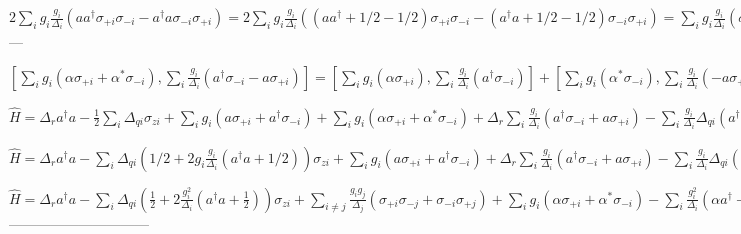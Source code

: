 \documentclass[11pt, spanish]{report}
\begin{document}
$ 2 \sum\limits_i g_i \frac{g_i} {\Delta_i} (a a^\dagger \sigma_{+i} \sigma_{-i} - a^\dagger a \sigma_{-i} \sigma_{+i}) =
2 \sum\limits_i g_i \frac{g_i} {\Delta_i} ((a a^\dagger + 1/2 - 1/2) \sigma_{+i} \sigma_{-i} - (a^\dagger a + 1/2 - 1/2) \sigma_{-i} \sigma_{+i}) =
\sum\limits_i g_i \frac{g_i} {\Delta_i} (\sigma_{+i} \sigma_{-i} + \sigma_{-i} \sigma_{+i}) -
2 \sum\limits_i g_i \frac{g_i} {\Delta_i} (a^\dagger a + 1/2) \sigma_{zi} =
\sum\limits_i (g_i \frac{g_i} {\Delta_i} - 2 g_i \frac{g_i} {\Delta_i} (a^\dagger a + 1/2) \sigma_{zi}) $
---


$ [\sum\limits_i g_i (\alpha \sigma_{+i} + \alpha^* \sigma_{-i}), \sum\limits_i \frac{g_i} {\Delta_i} (a^\dagger \sigma_{-i} - a \sigma_{+i})] =
[\sum\limits_i g_i (\alpha \sigma_{+i}), \sum\limits_i \frac{g_i} {\Delta_i} (a^\dagger \sigma_{-i})] +
[\sum\limits_i g_i (\alpha^* \sigma_{-i}), \sum\limits_i \frac{g_i} {\Delta_i} (- a \sigma_{+i})] =
- \sum\limits_i g_i \frac{g_i} {\Delta_i} (\alpha a^\dagger + \alpha^* a) \sigma_{zi} $


$\hat{H} = \Delta_r a^\dagger a - \frac{1}{2} \sum\limits_i \Delta_{qi}
\sigma_{zi} + \sum\limits_i g_i (a \sigma_{+i} + a^\dagger \sigma_{-i}) +
\sum\limits_i g_i (\alpha \sigma_{+i} + \alpha^* \sigma_{-i}) +
\Delta_r \sum\limits_i \frac{g_i} {\Delta_i} (a^\dagger \sigma_{-i} + a \sigma_{+i}) -
\sum\limits_i \frac{g_i} {\Delta_i} \Delta_{qi} (a^\dagger \sigma_{-i} + a \sigma_{+i}) +
\sum\limits_{i \neq j} g_i \frac{g_j} {\Delta_j} \sigma_{+i} \sigma_{-j} + \sigma_{-i} \sigma_{+j} +
\sum\limits_i (g_i \frac{g_i} {\Delta_i} - 2 g_i \frac{g_i} {\Delta_i} (a^\dagger a + 1/2) \sigma_{zi}) -
\sum\limits_i g_i \frac{g_i} {\Delta_i} (\alpha a^\dagger + \alpha^* a) \sigma_{zi} 
$

$\hat{H} = \Delta_r a^\dagger a - \sum\limits_i \Delta_{qi} (1/2 + 2 g_i \frac{g_i} {\Delta_i} (a^\dagger a + 1/2))
\sigma_{zi} + \sum\limits_i g_i (a \sigma_{+i} + a^\dagger \sigma_{-i}) +
\Delta_r \sum\limits_i \frac{g_i} {\Delta_i} (a^\dagger \sigma_{-i} + a \sigma_{+i}) -
\sum\limits_i \frac{g_i} {\Delta_i} \Delta_{qi} (a^\dagger \sigma_{-i} + a \sigma_{+i}) +
\sum\limits_{i \neq j} g_i \frac{g_j} {\Delta_j} \sigma_{+i} \sigma_{-j} + \sigma_{-i} \sigma_{+j} +
\sum\limits_i g_i (\alpha \sigma_{+i} + \alpha^* \sigma_{-i}) -
\sum\limits_i g_i \frac{g_i} {\Delta_i} (\alpha a^\dagger + \alpha^* a) \sigma_{zi} 
$


$\hat{H} = \Delta_r a^\dagger a - \sum\limits_i \Delta_{qi} (\frac{1}{2} + 2 \frac{g_i^2} {\Delta_i} (a^\dagger a + \frac{1}{2})) \sigma_{zi} +
\sum\limits_{i \neq j} \frac{g_i g_j} {\Delta_j} (\sigma_{+i} \sigma_{-j} +
\sigma_{-i} \sigma_{+j}) +
\sum\limits_i g_i (\alpha \sigma_{+i} + \alpha^* \sigma_{-i}) -
\sum\limits_i \frac{g_i^2} {\Delta_i} (\alpha a^\dagger + \alpha^* a) \sigma_{zi} $ 
------------------------------
\end{document}
